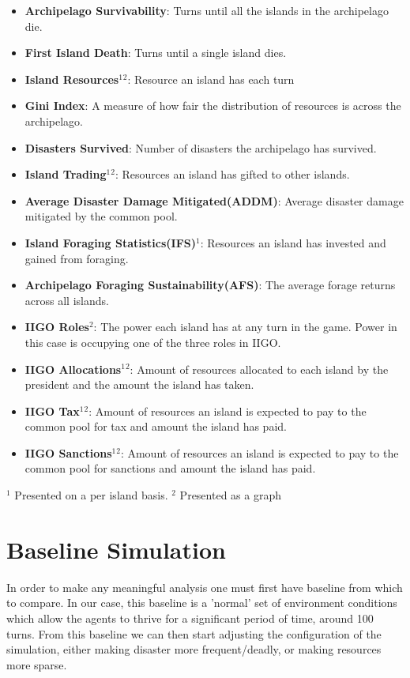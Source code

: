 \begin{itemize}
    \item \textbf{Archipelago Survivability}: Turns until all the islands in the archipelago die.
    \item \textbf{First Island Death}: Turns until a single island dies.
    \item \textbf{Island Resources$^1$$^2$}: Resource an island has each turn
    \item \textbf{Gini Index}: A measure of how fair the distribution of resources is across the archipelago.
    \item \textbf{Disasters Survived}: Number of disasters the archipelago has survived.
    \item \textbf{Island Trading$^1$$^2$}: Resources an island has gifted to other islands.
    \item \textbf{Average Disaster Damage Mitigated(ADDM)}: Average disaster damage mitigated by the common pool.
    \item \textbf{Island Foraging Statistics(IFS)$^1$}: Resources an island has invested and gained from foraging.
    \item \textbf{Archipelago Foraging Sustainability(AFS)}: The average forage returns across all islands.
    \item \textbf{IIGO Roles$^2$}: The power each island has at any turn in the game. Power in this case is occupying one of the three roles in IIGO.
    \item \textbf{IIGO Allocations$^1$$^2$}: Amount of resources allocated to each island by the president and the amount the island has taken.
    \item \textbf{IIGO Tax$^1$$^2$}: Amount of resources an island is expected to pay to the common pool for tax and amount the island has paid.
    \item \textbf{IIGO Sanctions$^1$$^2$}: Amount of resources an island is expected to pay to the common pool for sanctions and amount the island has paid.
    
\end{itemize}
\small{$^1$ Presented on a per island basis. $^2$ Presented as a graph}

\section{Baseline Simulation}
\label{sec:Simulations:baseline}

In order to make any meaningful analysis one must first have baseline from which to compare. In our case, this baseline is a 'normal' set of environment conditions which allow the agents to thrive for a significant period of time, around 100 turns. From this baseline we can then start adjusting the configuration of the simulation, either making disaster more frequent/deadly, or making resources more sparse.

